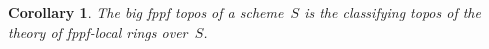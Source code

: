 \documentclass[10pt,reqno,a4paper]{amsbook}
\makeatletter
\theoremstyle{definition}
\theoremstyle{plain}
\newtheorem{cor}[defn]{Corollary}
\newtheorem{thm}[defn]{Theorem}
\theoremstyle{remark}
\newcommand{\placeholder}{\underline{\quad}}
\newcommand{\?}{\,{:}\,}
\renewcommand{\_}{\mathpunct{.}\,}
\newcommand{\lra}{\longrightarrow}
\newcommand{\defeq}{\vcentcolon=}
\renewenvironment{proof}[1][\proofname]{\par
  \pushQED{\qed}%
  \normalfont \topsep6\p@\@plus6\p@\relax
  \trivlist
  \item[\hskip\labelsep
        \itshape
    #1\@addpunct{.}]\ignorespaces
}{%
  \popQED\endtrivlist\@endpefalse
}
\makeatother
\begin{document}
%
%
%
%
%

\begin{cor}\label{cor:big-fpps-topos-classifies}
The big fppf topos of a scheme~$S$ is the classifying topos of the
theory of fppf-local rings over~$S$.\end{cor}
\end{document}
